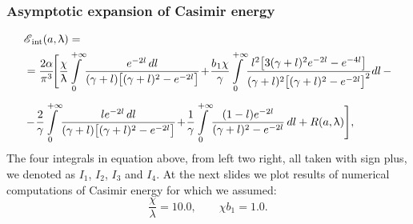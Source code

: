\documentclass[10pt,t]{beamer}
\begin{document}
\begin{frame}
  \frametitle{Asymptotic expansion of Casimir energy}

  \vspace{-2.5em}


  \begin{equation}
    \label{eq:Rescaled-version-of-the-model-06}
    \begin{split}
      &\EInt( a, \lambda ) = \\
      &=
        \frac{ 2 \alpha }{ \pi^{ 3 } } \! \Bigg[ \frac{ \chi }{ \lambda } \!
        \int\limits_{ 0 }^{ +\infty } \!
        \frac{ e^{ -2 l } \, dl }{ ( \gamma + l )
        \big[ ( \gamma + l )^{ 2 } - e^{ -2 l } \big] } \! + \!
        \frac{ b_{ \HorSpaceOne 1 } \chi }{ \gamma } \!
        \int\limits_{ 0 }^{ +\infty } \!
        \frac{ l^{ 2 } \big[ 3 ( \gamma + l )^{ 2 } e^{ -2 l } -
        e^{ -4 l } \big] }
        { ( \gamma + l )^{ 2 }
        \big[ ( \gamma + l )^{ 2 } - e^{ -2 l } \big]^{ 2 } } dl
        \, - \\[0.5em]
      &- \! \frac{ 2 }{ \gamma } \! \int\limits_{ 0 }^{ +\infty } \!
        \frac{ l e^{ -2 l }\, dl }{ ( \gamma + l )
        \big[ ( \gamma + l )^{ 2 } - e^{ -2 l } \big] } \! + \!
        \frac{ 1 }{ \gamma } \!
        \int\limits_{ 0 }^{ +\infty } \! \frac{ ( 1 - l ) e^{ -2 l } }{
        ( \gamma + l )^{ 2 } - e^{ -2 l } } \, dl + R( a, \lambda ) \Bigg],
    \end{split}
  \end{equation}
  The four integrals in equation above, from left two right, all taken
  with sign plus, we denoted as $I_{ 1 }$, $I_{ 2 }$, $I_{ 3 }$ and $I_{ 4 }$.
  At the next slides we plot results of numerical computations of Casimir
  energy for which we assumed:
  \begin{equation}
    \label{eq:Rescaled-version-of-the-model-07}
    \frac{ \chi }{ \lambda } = 10.0, \qquad
    \chi b_{ 1 } = 1.0.
  \end{equation}

\end{frame}
\end{document}
